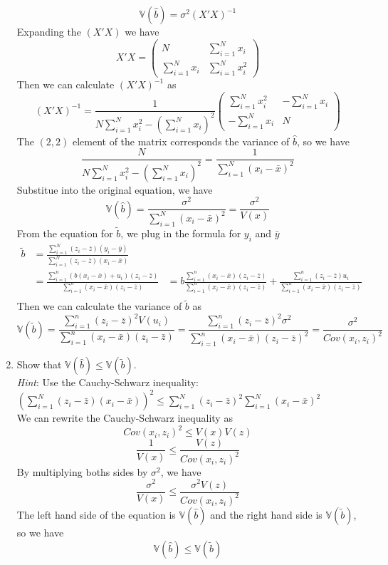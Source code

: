 \documentclass[12pt]{article}
\begin{document}
\begin{flushleft}
\begin{enumerate}
\[    \mathbb{V}(\hat{b})=\sigma^2(X'X)^{-1}
    \]
    Expanding the $(X'X)$ we have
    \[
    X'X=\begin{pmatrix} N & \sum_{i=1}^N x_i \\ \sum_{i=1}^N x_i & \sum_{i=1}^N x_i^2 \end{pmatrix}
    \]
    Then we can calculate $(X'X)^{-1}$ as
    \[
    (X'X)^{-1}=\frac{1}{N\sum_{i=1}^N x_i^2-\left(\sum_{i=1}^N x_i\right)^2}\begin{pmatrix} \sum_{i=1}^N x_i^2 & -\sum_{i=1}^N x_i \\ -\sum_{i=1}^N x_i & N \end{pmatrix}
    \]
    The $(2,2)$ element of the matrix corresponds the variance of $\hat{b}$, so we have
    \[
    \frac{N}{N\sum_{i=1}^N x_i^2-\left(\sum_{i=1}^N x_i\right)^2}= \frac{1}{\sum_{i=1}^N(x_i-\bar{x})^2}
    \]
    Substitue into the original equation, we have
    \[
    \mathbb{V}(\hat{b})=\frac{\sigma^2}{\sum_{i=1}^N(x_i-\bar{x})^2}=\frac{\sigma^2}{V(x)}
    \]
    From the equation for $\tilde{b}$, we plug in the formula for  $y_i$ and $\bar{y}$
    \begin{align*}
        \tilde{b}&=\frac{\sum_{i=1}^N(z_i-\bar{z})(y_i-\bar{y})}{\sum_{i=1}^N(z_i-\bar{z})(x_i-\bar{x})}\\ 
        &=\frac{\sum_{i=1}^n(b(x_i-\bar{x})+u_i)(z_i-\bar{z})}{\sum_{i=1}^n(x_i-\bar{x})(z_i-\bar{z})}
        &=b\frac{\sum_{i=1}^n(x_i-\bar{x})(z_i-\bar{z})}{\sum_{i=1}^n(x_i-\bar{x})(z_i-\bar{z})}+\frac{\sum_{i=1}^n(z_i-\bar{z})u_i}{\sum_{i=1}^n(x_i-\bar{x})(z_i-\bar{z})}\\
    \end{align*}
   Then we can calculate the variance of $\tilde{b}$ as
    \[
    \mathbb{V}(\tilde{b})=\frac{\sum_{i=1}^n(z_i-\bar{z})^2V(u_i)}{\sum_{i=1}^n(x_i-\bar{x})(z_i-\bar{z})}=\frac{\sum_{i=1}^n(z_i-\bar{z})^2\sigma^2}{\sum_{i=1}^n(x_i-\bar{x})(z_i-\bar{z})^2}=\frac{\sigma^2}{Cov(x_i,z_i)^2}
    \]
    \item Show that $\mathbb{V}(\hat{b}) \leq \mathbb{V}(\tilde{b})$.\\
    \textit{Hint}: Use the Cauchy-Schwarz inequality: $(\sum_{i=1}^N(z_i-\bar{z})(x_i-\bar{x}))^{2}\leq \sum_{i=1}^N(z_i-\bar{z})^2\sum_{i=1}^N(x_i-\bar{x})^2$\\
    We can rewrite the Cauchy-Schwarz inequality as
    \[
    Cov(x_i,z_i)^2\leq V(x)V(z)
    \]
    \[
    \frac{1}{V(x)}\leq \frac{V(z)}{Cov(x_i,z_i)^2}
    \]
    By multiplying boths sides by $\sigma^2$, we have
    \[
    \frac{\sigma^2}{V(x)}\leq \frac{\sigma^2V(z)}{Cov(x_i,z_i)^2}
    \]
    The left hand side of the equation is $\mathbb{V}(\hat{b})$ and the right hand side is $\mathbb{V}(\tilde{b})$, so we have
    \[
    \mathbb{V}(\hat{b})\leq \mathbb{V}(\tilde{b})
    \]
\end{enumerate}

\end{flushleft}
\end{document}
